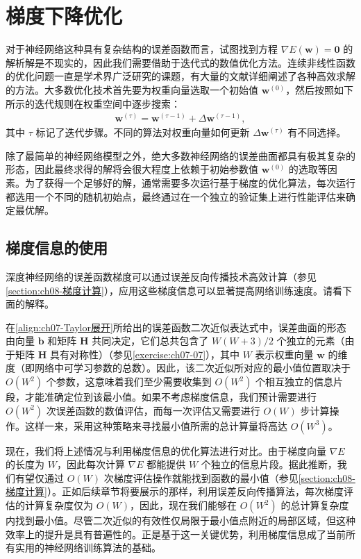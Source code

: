\documentclass[../../main.tex]{subfiles}
\begin{document}
\section{梯度下降优化}\label{section:ch07-梯度下降优化}

对于神经网络这种具有复杂结构的误差函数而言，试图找到方程 $\nabla E(\mathbf{w})=\mathbf{0}$ 的解析解是不现实的，因此我们需要借助于迭代式的数值优化方法。连续非线性函数的优化问题一直是学术界广泛研究的课题，有大量的文献详细阐述了各种高效求解的方法。大多数优化技术首先要为权重向量选取一个初始值 $\mathbf{w}^{(0)}$，然后按照如下所示的迭代规则在权重空间中逐步搜索：
\begin{align}
\mathbf{w}^{(\tau)} = \mathbf{w}^{(\tau-1)}+\Delta\mathbf{w}^{(\tau-1)},
\label{align:ch07-迭代规则}
\end{align}
其中 $\tau$ 标记了迭代步骤。不同的算法对权重向量如何更新 $\Delta\mathbf{w}^{(\tau)}$ 有不同选择。

除了最简单的神经网络模型之外，绝大多数神经网络的误差曲面都具有极其复杂的形态，因此最终求得的解将会很大程度上依赖于初始参数值 $\mathbf{w}^{(0)}$ 的选取等因素。为了获得一个足够好的解，通常需要多次运行基于梯度的优化算法，每次运行都选用一个不同的随机初始点，最终通过在一个独立的验证集上进行性能评估来确定最优解。

\subsection{梯度信息的使用}\label{subsection:ch07-梯度信息的使用}

深度神经网络的误差函数梯度可以通过误差反向传播技术高效计算（参见\cref{section:ch08-梯度计算}），应用这些梯度信息可以显著提高网络训练速度。请看下面的解释。

在\eqref{align:ch07-Taylor展开}所给出的误差函数二次近似表达式中，误差曲面的形态由向量 $\mathbf{b}$ 和矩阵 $\mathbf{H}$ 共同决定，它们总共包含了 $W(W+3)/2$ 个独立的元素（由于矩阵 $\mathbf{H}$ 具有对称性）（参见\cref{exercise:ch07-07}），其中 $W$ 表示权重向量 $\mathbf{w}$ 的维度（即网络中可学习参数的总数）。因此，该二次近似所对应的最小值位置取决于 $O(W^{2})$ 个参数，这意味着我们至少需要收集到 $O(W^{2})$ 个相互独立的信息片段，才能准确定位到该最小值。如果不考虑梯度信息，我们预计需要进行 $O(W^{2})$ 次误差函数的数值评估，而每一次评估又需要进行 $O(W)$ 步计算操作。这样一来，采用这种策略来寻找最小值所需的总计算量将高达 $O(W^{3})$。

现在，我们将上述情况与利用梯度信息的优化算法进行对比。由于梯度向量 $\nabla E$ 的长度为 $W$，因此每次计算 $\nabla E$ 都能提供 $W$ 个独立的信息片段。据此推断，我们有望仅通过 $O(W)$ 次梯度评估操作就能找到函数的最小值（参见\cref{section:ch08-梯度计算}）。正如后续章节将要展示的那样，利用误差反向传播算法，每次梯度评估的计算复杂度仅为 $O(W)$，因此，现在我们能够在 $O(W^{2})$ 的总计算复杂度内找到最小值。尽管二次近似的有效性仅局限于最小值点附近的局部区域，但这种效率上的提升是具有普遍性的。正是基于这一关键优势，利用梯度信息成了当前所有实用的神经网络训练算法的基础。
\end{document}
